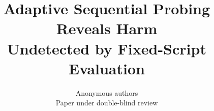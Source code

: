\documentclass{article}
\title{Adaptive Sequential Probing Reveals Harm\\
Undetected by Fixed-Script Evaluation}
\author{Anonymous authors\\Paper under double-blind review}
\begin{document}
\ifcolmsubmission
\linenumbers
\fi

\maketitle





\end{document}
